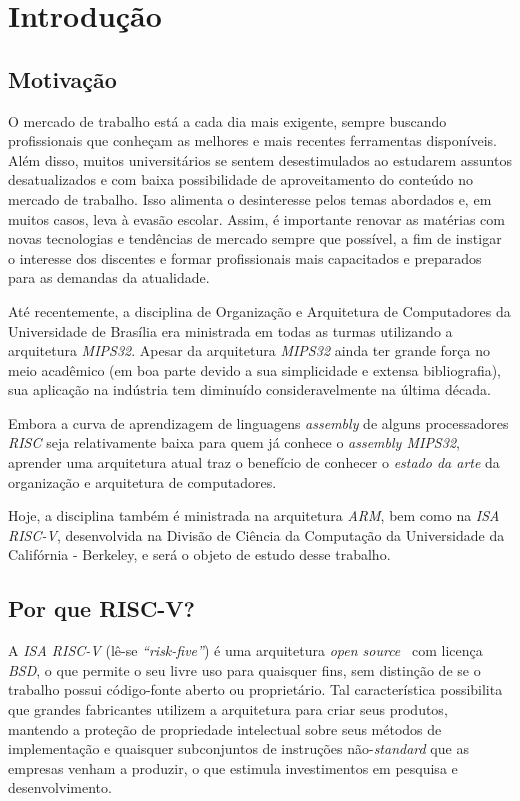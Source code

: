 \chapter{Introdução}\label{cap_intro}


\section{Motivação}
{
    O mercado de trabalho está a cada dia mais exigente, sempre buscando
    profissionais que conheçam as melhores e mais recentes ferramentas
    disponíveis. Além disso, muitos universitários se sentem desestimulados
    ao estudarem assuntos desatualizados e com baixa possibilidade de
    aproveitamento do conteúdo no mercado de trabalho. Isso alimenta o
    desinteresse pelos temas abordados e, em muitos casos, leva à evasão
    escolar. Assim, é importante renovar as matérias com novas tecnologias
    e tendências de mercado sempre que possível, a fim de instigar o
    interesse dos discentes e formar profissionais mais capacitados e
    preparados para as demandas da atualidade.
}

{
    Até recentemente, a disciplina de Organização e Arquitetura de Computadores
    da Universidade de Brasília era ministrada em todas as turmas utilizando a
    arquitetura \textit{MIPS32}. Apesar da arquitetura \textit{MIPS32} ainda ter
    grande força no meio acadêmico (em boa parte devido a sua simplicidade e
    extensa bibliografia), sua aplicação na indústria tem diminuído
    consideravelmente na última década.
}

{
    Embora a curva de aprendizagem de linguagens \textit{assembly} de alguns
    processadores \textit{RISC} seja relativamente baixa para quem já conhece o
    \textit{assembly MIPS32}, aprender uma arquitetura atual traz o benefício de
    conhecer o \textit{estado da arte} da organização e arquitetura de
    computadores.
}

{
    Hoje, a disciplina também é ministrada na arquitetura \textit{ARM}, bem como
    na \textit{ISA RISC-V}, desenvolvida na Divisão de Ciência da Computação da
    Universidade da Califórnia - Berkeley, e será o objeto de estudo desse
    trabalho.
}


\section{Por que RISC-V?}
{
    A \textit{ISA RISC-V} (lê-se \textit{``risk-five''}) é uma arquitetura
    \textit{open source}~\cite{riscv_spec} com licença \textit{BSD}, o que
    permite o seu livre uso para quaisquer fins, sem distinção de se o trabalho
    possui código-fonte aberto ou proprietário. Tal característica possibilita
    que grandes fabricantes utilizem a arquitetura para criar seus produtos,
    mantendo a proteção de propriedade intelectual sobre seus métodos de
    implementação e quaisquer subconjuntos de instruções não-\textit{standard}
    que as empresas venham a produzir, o que estimula investimentos em pesquisa
    e desenvolvimento.
}

